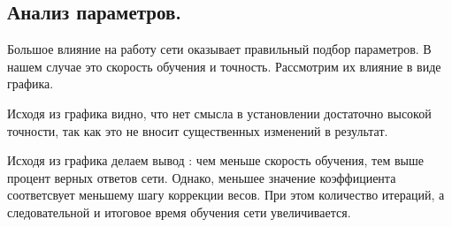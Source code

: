 \subsection{Анализ параметров.}
Большое влияние на работу сети оказывает правильный подбор параметров. В нашем случае это скорость обучения и точность. Рассмотрим их влияние в виде графика.
\begin{figure}[H]
\end{figure}
Исходя из графика видно, что нет смысла в установлении достаточно высокой точности, так как это не вносит существенных изменений в результат. 
\begin{figure}[H]
\end{figure}
Исходя из графика делаем вывод : чем меньше скорость обучения, тем выше процент верных ответов сети. Однако, меньшее значение коэффициента соответсвует меньшему шагу коррекции весов. При этом количество итераций, а следовательной и итоговое время обучения сети увеличивается.
